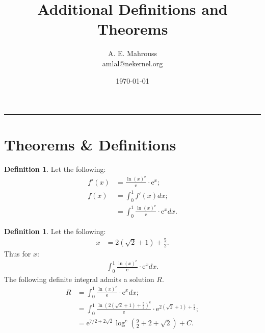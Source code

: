 \documentclass[10pt]{article}
\title{%
	\vspace{-1.5em}%
	\large\textbf{Additional Definitions and Theorems}%
}
\author{A. E. Mahrouss\\amlal@nekernel.org}
\date{\today}
\theoremstyle{plain}
\theoremstyle{definition}
\newtheorem{definition}[theorem]{Definition}
\theoremstyle{remark}
\begin{document}
	
	\maketitle
	\vspace{-0.5em}
	\vspace{0.8em}
	\rule{\linewidth}{0.4pt}
	\vspace{1em}
	
	\section{Theorems \& Definitions}
	
	\begin{definition}
		Let the following:
		\begin{align*}
			f'(x)&= \frac{\ln (x)^{\mathrm{e}}}{\mathrm{e}} \cdot \mathrm{e}^{x};\\
			f(x) &= \int_{0}^{1} f'(x)dx;\\
			&= \int_{0}^{1} \frac{\ln (x)^{\mathrm{e}}}{\mathrm{e}} \cdot \mathrm{e}^{x} dx.
		\end{align*}
	\end{definition}
	
	\begin{definition}
		Let the following:
		\begin{align*}
			x &= 2(\sqrt{2} + 1) + \frac{5}{2}.
		\end{align*}
		Thus for $x$:
		\begin{align*}
			\int_{0}^{1} \frac{\ln (x)^{\mathrm{e}}}{\mathrm{e}} \cdot \mathrm{e}^{x} dx.
		\end{align*}
		The following definite integral admits a solution $R$.
		\begin{align*}
			R &= \int_{0}^{1} \frac{\ln (x)^{\mathrm{e}}}{\mathrm{e}} \cdot \mathrm{e}^{x} dx;\\
			&= \int_{0}^{1} \frac{\ln (2(\sqrt{2} + 1) + \frac{5}{2})^{\mathrm{e}}}{\mathrm{e}} \cdot \mathrm{e}^{2(\sqrt{2} + 1) + \frac{5}{2}};\\
			&= \mathrm{e}^{7/2+2 \sqrt{2}} \log^{e}(\frac{9}{2}+2+\sqrt{2}) + C.
		\end{align*}
	\end{definition}
	
	\nocite{*}
	
	
	
	
\end{document}
